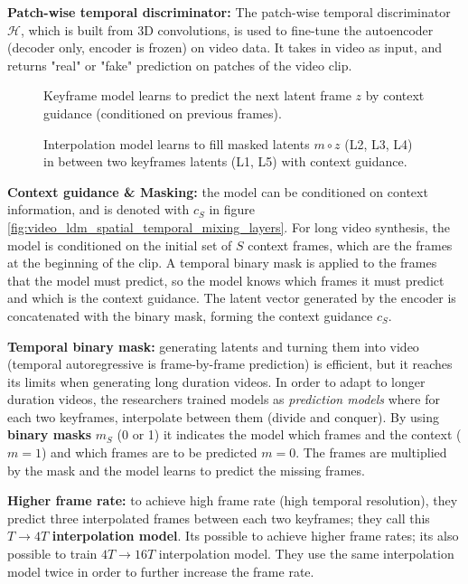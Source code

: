 \textbf{Patch-wise temporal discriminator:} The patch-wise temporal discriminator $\mathcal{H}$, which is built from 3D convolutions, is used to fine-tune the autoencoder (decoder only, encoder is frozen) on video data. It takes in video as input, and returns "real" or "fake" prediction on patches of the video clip.


\begin{figure}
    \centering
    \scalebox{0.5}{
        
    }
    \caption{Keyframe model learns to predict the next latent frame $z$ by context guidance (conditioned on previous frames).}
\end{figure}

\begin{figure}
    \centering
    \scalebox{0.5}{
        
    }
    \caption{Interpolation model learns to fill masked latents $m \circ z$ (L2, L3, L4) in between two keyframes latents (L1, L5) with context guidance.}
\end{figure}

\textbf{Context guidance \& Masking:} the model can be conditioned on context information, and is denoted with $c_S$ in figure \ref{fig:video_ldm_spatial_temporal_mixing_layers}. For long video synthesis, the model is conditioned on the initial set of $S$ context frames, which are the frames at the beginning of the clip. A temporal binary mask is applied to the frames that the model must predict, so the model knows which frames it must predict and which is the context guidance. The latent vector generated by the encoder is concatenated with the binary mask, forming the context guidance $c_S$.

\textbf{Temporal binary mask:} generating latents and turning them into video (temporal autoregressive is frame-by-frame prediction) is efficient, but it reaches its limits when generating long duration videos. In order to adapt to longer duration videos, the researchers trained models as \textit{prediction models} where for each two keyframes, interpolate between them (divide and conquer). By using \textbf{binary masks} $m_S$ (0 or 1) it indicates the model which frames and the context ($m = 1$) and which frames are to be predicted $m = 0$. The frames are multiplied by the mask and the model learns to predict the missing frames.

\textbf{Higher frame rate:} to achieve high frame rate (high temporal resolution), they predict three interpolated frames between each two keyframes; they call this $T \rightarrow 4T$ \textbf{interpolation model}. Its possible to achieve higher frame rates; its also possible to train $4T \rightarrow 16T$ interpolation model. They use the same interpolation model twice in order to further increase the frame rate.

